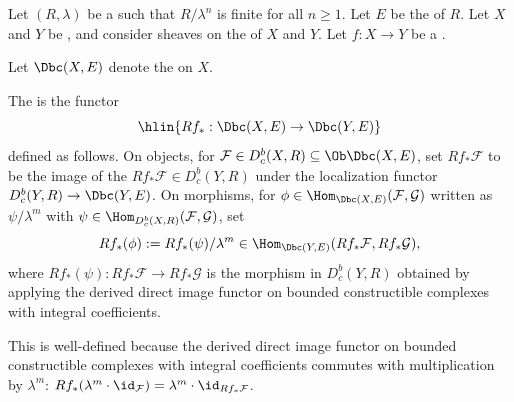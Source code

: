 \begin{definition} \label{definition:derived_direct_image_functor_on_bounded_constructible_complexes_with_rational_coefficients_on_a_noetherian_scheme}
Let $(R, \lambda)$ be a   such that $R/\lambda^n$ is finite for all $n \geq 1$. Let $E$ be the  of $R$. Let $X$ and $Y$ be , and consider sheaves on the  of $X$ and $Y$. Let $f: X \to Y$ be a .

Let $\Dbc(X, E)$ denote the  on $X$.

The  is the functor
$$\hlin{Rf_* : \Dbc(X, E) \to \Dbc(Y, E)}$$
defined as follows. On objects, for $\mathcal{F} \in D_c^b(X, R) \subseteq \Ob \Dbc(X, E)$, set $Rf_* \mathcal{F}$ to be the image of the  $Rf_* \mathcal{F} \in D_c^b(Y, R)$ under the localization functor $D_c^b(Y, R) \to \Dbc(Y, E)$. On morphisms, for $\phi \in \Hom_{\Dbc(X, E)}(\mathcal{F}, \mathcal{G})$ written as $\psi / \lambda^m$ with $\psi \in \Hom_{D_c^b(X, R)}(\mathcal{F}, \mathcal{G})$, set
$$Rf_* (\phi) := Rf_*(\psi) / \lambda^m \in \Hom_{\Dbc(Y, E)}(Rf_* \mathcal{F}, Rf_* \mathcal{G}),$$
where $Rf_*(\psi): Rf_* \mathcal{F} \to Rf_* \mathcal{G}$ is the morphism in $D_c^b(Y, R)$ obtained by applying the derived direct image functor on bounded constructible complexes with integral coefficients.

This is well-defined because the derived direct image functor on bounded constructible complexes with integral coefficients commutes with multiplication by $\lambda^m$: $Rf_*(\lambda^m \cdot \id_\mathcal{F}) = \lambda^m \cdot \id_{Rf_* \mathcal{F}}$.
\end{definition}
